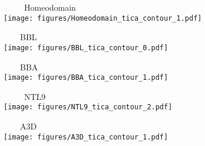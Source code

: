 \begin{minipage}{\textwidth}
    \footnotesize
    \subcaption{~~~~~~~~~~~~~~~~~~~~~~~~~~~~~~~~~~~~~~~~~~~~~~~~~~~~~~~~~~~~~~~~~~~~~~~~~~~~~~~~~~~~~~~~~~~~~~~~~~~~~~~~~~~~~~~~~~~~~~~~~~~~~~~~~~~~~~~~~~~~~~~~~~~~~~~~~~~~~~~~~~~~~~~~~~~~~~~~~~~~~~~~~~~~~~~~~~~~~~~~~}
    \label{fig:protein_data}

    \begin{minipage}{0.19\textwidth}
        \centering ~~~~~Homeodomain\\
        \texttt{[image: figures/Homeodomain\_tica\_contour\_1.pdf]}
    \end{minipage}
    \begin{minipage}{0.19\textwidth}
        \centering ~~~~BBL\\
        \texttt{[image: figures/BBL\_tica\_contour\_0.pdf]}
    \end{minipage}
    \begin{minipage}{0.19\textwidth}
        \centering ~~~~BBA\\
        \texttt{[image: figures/BBA\_tica\_contour\_1.pdf]}
    \end{minipage}
    \begin{minipage}{0.19\textwidth}
        \centering ~~~~~NTL9\\
        \texttt{[image: figures/NTL9\_tica\_contour\_2.pdf]}
    \end{minipage}
    \begin{minipage}{0.19\textwidth}
        \centering ~~~~A3D\\
        \texttt{[image: figures/A3D\_tica\_contour\_1.pdf]}
    \end{minipage}
\end{minipage}

\vspace{-0.2cm}

